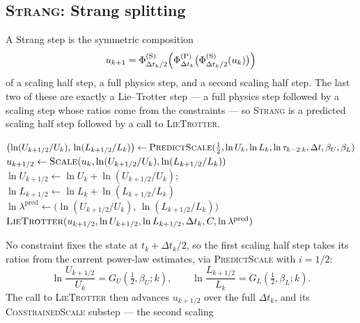 \documentclass{article}
\begin{document}
\subsection{\textsc{Strang}: Strang splitting}\label{ssec:alg-strang}
A Strang step is the symmetric composition
\begin{equation}\label{eq:alg-strang-composition}
  u_{k+1} = \Phi_{\Delta t_k/2}^{(\mathrm{S})}\Bigl(\Phi_{\Delta t_k}^{(\mathrm{P})}\bigl(\Phi_{\Delta t_k/2}^{(\mathrm{S})}(u_k)\bigr)\Bigr)
\end{equation}
of a scaling half step, a full physics step, and a second scaling half step.
The last two of these are exactly a Lie--Trotter step --- a full physics step
followed by a scaling step whose ratios come from the constraints --- so
\textsc{Strang} is a predicted scaling half step followed by a call to
\textsc{LieTrotter}.
\begin{algorithm}[H]
\caption{Strang step}
\begin{algorithmic}[1]
  \State $\bigl(\ln (U_{k+1/2}/U_k),\, \ln (L_{k+1/2}/L_k)\bigr) \gets \Call{PredictScale}{\tfrac12, \ln U_k, \ln L_k, \ln \tau_{k-2:k}, \Delta t, \beta_U, \beta_L}$ \Comment{\eqref{eq:alg-strang-predict}}
  \State $u_{k+1/2} \gets \Call{Scale}{u_k, \ln (U_{k+1/2}/U_k), \ln (L_{k+1/2}/L_k)}$
  \State $\ln U_{k+1/2} \gets \ln U_k + \ln (U_{k+1/2}/U_k)$;\ \ $\ln L_{k+1/2} \gets \ln L_k + \ln (L_{k+1/2}/L_k)$
  \State $\ln \lambda^{\mathrm{pred}} \gets \bigl(\ln (U_{k+1/2}/U_k),\, \ln (L_{k+1/2}/L_k)\bigr)$ 
  \State \Return $\Call{LieTrotter}{u_{k+1/2}, \ln U_{k+1/2}, \ln L_{k+1/2}, \Delta t_k, C, \ln \lambda^{\mathrm{pred}}}$ \Comment{\S\ref{ssec:alg-lie-trotter}}
\EndFunction
\end{algorithmic}
\end{algorithm}
No constraint fixes the state at $t_k + \Delta t_k/2$, so the first scaling half
step takes its ratios from the current power-law estimates, via
\textsc{PredictScale} with $i = 1/2$:
\begin{equation}\label{eq:alg-strang-predict}
  \ln\frac{U_{k+1/2}}{U_k} = G_U\!\left(\tfrac12, \beta_U; k\right), \qquad
  \ln\frac{L_{k+1/2}}{L_k} = G_L\!\left(\tfrac12, \beta_L; k\right).
\end{equation}
The call to \textsc{LieTrotter} then advances $u_{k+1/2}$ over the full
$\Delta t_k$, and its \textsc{ConstrainedScale} substep --- the second scaling
\end{document}
